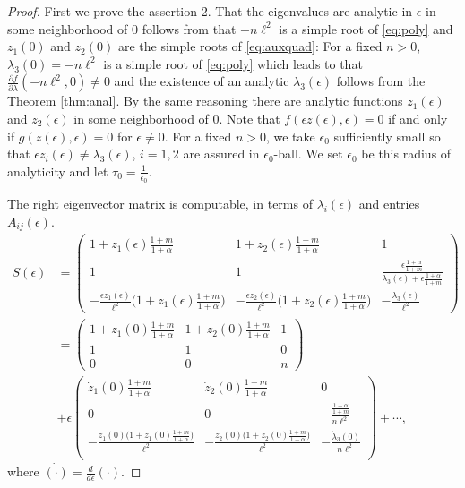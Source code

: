 \documentclass[a4paper,11pt]{article}
\def\l{{\ell}}
\theoremstyle{remark}
\begin{document}
\begin{proof}
 First we prove the assertion 2. That the eigenvalues are analytic in $\epsilon$ in some neighborhood of $0$ follows from that $-n\l^2$ is a simple root of \eqref{eq:poly} and $z_1(0)$ and $z_2(0)$ are the simple roots of \eqref{eq:auxquad}: For a fixed $n>0$, $\lambda_3(0)= -n\l^2$ is a simple root of \eqref{eq:poly} which leads to that $\frac{\partial f}{\partial \lambda}(-n\l^2,0)\ne 0$ and the existence of an analytic $\lambda_3(\epsilon)$ follows from the Theorem \ref{thm:anal}. By the same reasoning there are analytic functions $z_1(\epsilon)$ and $z_2(\epsilon)$ in some neighborhood of $0$. Note that $f(\epsilon z(\epsilon),\epsilon)=0$ if and only if $g(z(\epsilon),\epsilon)=0$ for $\epsilon\ne0$. For a fixed $n>0$, we take $\epsilon_0$ sufficiently small so that $\epsilon z_i(\epsilon)\ne \lambda_3(\epsilon)$, $i=1,2$ are assured in $\epsilon_0$-ball. We set $\epsilon_0$ be this radius of analyticity and let $\tau_0 = \frac{1}{\epsilon_0}$.

 The right eigenvector matrix is computable, in terms of $\lambda_i(\epsilon)$ and entries $A_{ij}(\epsilon)$.
 \begin{equation} \label{eq:S}
  \begin{aligned}
 S(\epsilon) &=   \begin{pmatrix}
     1 + z_1(\epsilon)\frac{1+m}{1+\alpha} & 1 + z_2(\epsilon)\frac{1+m}{1+\alpha} & 1\\
     1 & 1 & \frac{\epsilon \tfrac{1+\alpha}{1+m}}{\lambda_3(\epsilon) + \epsilon\tfrac{1+\alpha}{1+m}}\\
     -\frac{\epsilon z_1(\epsilon)}{\l^2}\Big(1 + z_1(\epsilon)\frac{1+m}{1+\alpha}\Big) & -\frac{\epsilon z_2(\epsilon)}{\l^2}\Big(1 + z_2(\epsilon)\frac{1+m}{1+\alpha}\Big) & -\frac{\lambda_3(\epsilon)}{\l^2}
    \end{pmatrix}\\
    &=\begin{pmatrix}
     1 + z_1(0)\frac{1+m}{1+\alpha} & 1 + z_2(0)\frac{1+m}{1+\alpha} & 1 \\
     1 & 1 & 0\\
     0 & 0 & n
    \end{pmatrix}\\&+ \epsilon
    \begin{pmatrix}
     \dot z_1(0)\frac{1+m}{1+\alpha} & \dot z_2(0)\frac{1+m}{1+\alpha} & 0 \nonumber\\
     0 & 0 & -\frac{\frac{1+\alpha}{1+m}}{n\l^2}\\
     -\frac{z_1(0)\big(1+z_1(0)\frac{1+m}{1+\alpha}\big)}{\l^2} & -\frac{z_2(0)\big(1+z_2(0)\frac{1+m}{1+\alpha}\big)}{\l^2} & -\frac{\dot\lambda_3(0)}{n\l^2} \nonumber\\
    \end{pmatrix} + \cdots,
  \end{aligned}
 \end{equation}
 where $\dot{(\cdot)}=\frac{d}{d\epsilon}(\cdot)$.


\end{proof}
\end{document}
